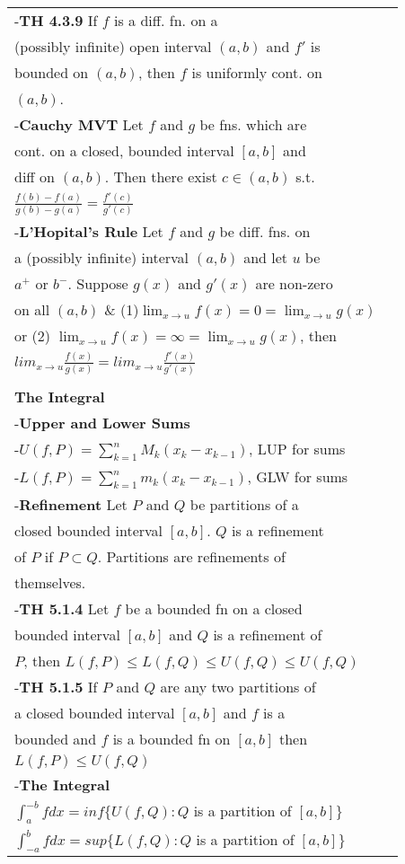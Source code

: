 \documentclass[10 pt,landscape]{article}
\begin{document}
\begin{multicols}{4}
\begin{tabular}{@{}ll@{}}
-\textbf{TH 4.3.9} If $f$ is a diff. fn. on a\\ (possibly infinite) open interval $(a,b)$ and $f'$ is \\ bounded on $(a,b)$, then $f$ is uniformly  cont. on\\ $(a,b)$.\\
-\textbf{Cauchy MVT} Let $f$ and $g$ be fns. which are \\cont. on a closed, bounded interval $[a,b]$ and\\ diff on $(a,b)$. Then there exist $c \in (a,b)$ s.t. \\ $\frac{f(b)-f(a)}{g(b)-g(a)}=\frac{f'(c)}{g'(c)}$\\
-\textbf{L'Hopital's Rule} Let $f$ and $g$ be diff. fns. on \\ a (possibly infinite) interval $(a,b)$ 
and let $u$ be \\
$a^{+}$ or $b^{-}$. Suppose $g(x)$ and $g'(x)$ are 
non-zero\\ on all $(a,b)$ \& (1)$ \lim_{x \to 
	u}f(x)=0=\lim_{x \to u}g(x)$ \\ or (2) $ \lim_{x \to u}f(x)=\infty=\lim_{x \to u}g(x)$, then\\ $lim_{x \to u}\frac{f(x)}{g(x)}=lim_{x \to u}\frac{f'(x)}{g'(x)}$\\
\\
\textbf{The Integral}\\
-\textbf{Upper and Lower Sums}\\
-$U(f,P)=\sum_{k=1}^{n}M_k(x_k-x_{k-1})$, LUP for sums\\
-$L(f,P)=\sum_{k=1}^{n}m_k(x_k-x_{k-1})$, GLW for sums\\
-\textbf{Refinement} Let $P$ and $Q$ be partitions of a \\closed bounded interval $[a,b]$. $Q$ is a refinement\\ of $P$ if $P \subset Q$. Partitions are refinements of\\ themselves.\\
-\textbf{TH 5.1.4} Let $f$ be a bounded fn on a closed\\ bounded interval $[a,b]$ and $Q$ is a refinement of \\$P$, then $L(f,P)\leq L(f,Q)\leq U(f,Q) \leq U(f,Q)$\\
-\textbf{TH 5.1.5} If $P$ and $Q$ are any two partitions of \\a closed bounded interval $[a,b]$ and $f$ is a \\bounded and $f$ is a bounded fn on $[a,b]$ then \\ $L(f,P)\leq U(f,Q)$\\
-\textbf{The Integral}\\
$\int_{a}^{-b}f dx=inf\{U(f,Q): Q$ is a partition of $[a,b]\}$\\
$\int_{-a}^{b}f dx=sup\{L(f,Q): Q$ is a partition of $[a,b]\}$\\
\end{tabular} 



\end{multicols}
\end{document}
